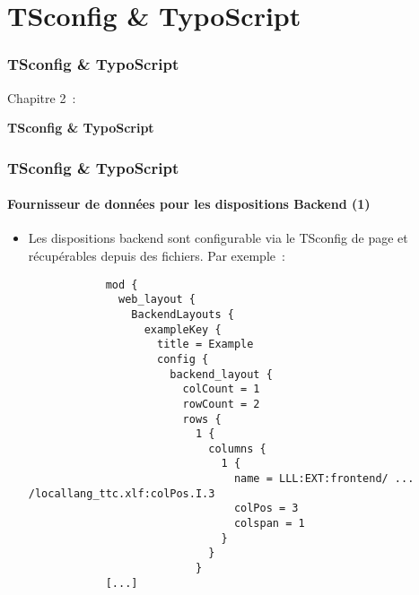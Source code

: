 %

\section{TSconfig \& TypoScript}
\begin{frame}[fragile]
	\frametitle{TSconfig \& TypoScript}

	\begin{center}\huge{Chapitre 2~:}\end{center}
	\begin{center}\huge{\color{typo3darkgrey}\textbf{TSconfig \& TypoScript}}\end{center}

\end{frame}

\begin{frame}[fragile]
	\frametitle{TSconfig \& TypoScript}
	\framesubtitle{Fournisseur de données pour les dispositions Backend (1)}

	\lstset{basicstyle=\tiny\ttfamily}

	\begin{itemize}
		\item Les dispositions backend sont configurable via le TSconfig de page et récupérables depuis des fichiers. Par exemple~:

		\begin{lstlisting}
			mod {
			  web_layout {
			    BackendLayouts {
			      exampleKey {
			        title = Example
			        config {
			          backend_layout {
			            colCount = 1
			            rowCount = 2
			            rows {
			              1 {
			                columns {
			                  1 {
			                    name = LLL:EXT:frontend/ ... /locallang_ttc.xlf:colPos.I.3
			                    colPos = 3
			                    colspan = 1
			                  }
			                }
			              }
			[...]
		\end{lstlisting}

	\end{itemize}

\end{frame}

